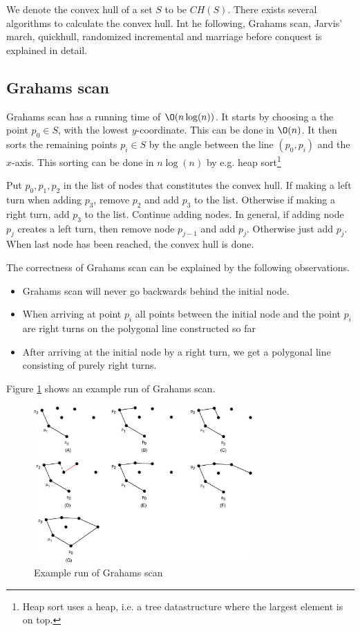 \documentclass[10pt]{article}
\begin{document}
We denote the convex hull of a set $S$ to be $CH(S)$. There exists several algorithms to calculate the convex hull. Int he following, Grahams scan, Jarvis' march, quickhull, randomized incremental and marriage before conquest is explained in detail.

\subsection{Grahams scan} %
\label{sub:grahams_scan}
Grahams scan has a running time of $\O(n\log(n))$. It starts by choosing a the point $p_0 \in S$, with the lowest $y$-coordinate. This can be done in $\O(n)$. It then sorts the remaining points $p_i \in S$ by the angle between the line $(p_0, p_i)$ and the $x$-axis. This sorting can be done in $n \log(n)$ by e.g. heap sort\footnote{Heap sort uses a heap, i.e. a tree datastructure where the largest element is on top.} 

Put $p_0, p_1, p_2$ in the list of nodes that constitutes the convex hull. If making a left turn when adding $p_3$, remove $p_2$ and add $p_3$ to the list. Otherwise if making a right turn, add $p_3$ to the list. Continue adding nodes. In general, if adding node $p_j$ creates a left turn, then remove node $p_{j-1}$ and add $p_j$. Otherwise just add $p_j$. When last node has been reached, the convex hull is done.

The correctness of Grahams scan can be explained by the following observations. 

\begin{itemize}
  \item Grahams scan will never go backwards behind the initial node. 
  \item When arriving at point $p_i$ all points between the initial node and the point $p_i$ are right turns on the polygonal line constructed so far
  \item After arriving at the initial node by a right turn, we get a polygonal line consisting of purely right turns. 
\end{itemize}

Figure \ref{fig16} shows an example run of Grahams scan.

\begin{figure}[ht]
\centering
\includegraphics[width=0.75\textwidth]{figures/fig16.pdf}
\caption{Example run of Grahams scan}
\label{fig16}
\end{figure}
\end{document}
